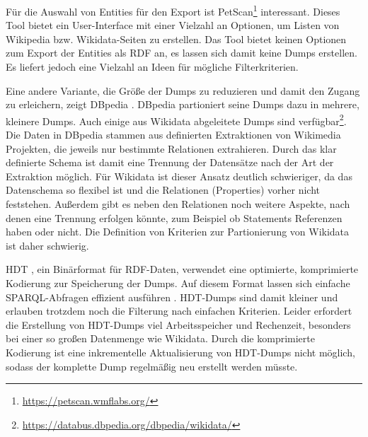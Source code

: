 Für die Auswahl von Entities für den Export ist PetScan\footnote{\url{https://petscan.wmflabs.org/}} interessant.
Dieses Tool bietet ein User-Interface mit einer Vielzahl an Optionen, um Listen von Wikipedia bzw. Wikidata-Seiten zu erstellen. 
Das Tool bietet keinen Optionen zum Export der Entities als RDF an, es lassen sich damit keine Dumps erstellen.
Es liefert jedoch eine Vielzahl an Ideen für mögliche Filterkriterien.

Eine andere Variante, die Größe der Dumps zu reduzieren und damit den Zugang zu erleichern, zeigt DBpedia \cite{dbpedia}.
DBpedia partioniert seine Dumps dazu in mehrere, kleinere Dumps.
Auch einige aus Wikidata abgeleitete Dumps sind verfügbar\footnote{\url{https://databus.dbpedia.org/dbpedia/wikidata/}}.
Die Daten in DBpedia stammen aus definierten Extraktionen von Wikimedia Projekten, die jeweils nur bestimmte Relationen extrahieren.
Durch das klar definierte Schema ist damit eine Trennung der Datensätze nach der Art der Extraktion möglich.
Für Wikidata ist dieser Ansatz deutlich schwieriger, da das Datenschema so flexibel ist und die Relationen (Properties) vorher nicht feststehen.
Außerdem gibt es neben den Relationen noch weitere Aspekte, nach denen eine Trennung erfolgen könnte, zum Beispiel ob Statements Referenzen haben oder nicht.
Die Definition von Kriterien zur Partionierung von Wikidata ist daher schwierig.

HDT \cite{hdt}, ein Binärformat für RDF-Daten, verwendet eine optimierte, komprimierte Kodierung zur Speicherung der Dumps.
Auf diesem Format lassen sich einfache SPARQL-Abfragen effizient ausführen \cite{hdt-query}.
HDT-Dumps sind damit kleiner und erlauben trotzdem noch die Filterung nach einfachen Kriterien.
Leider erfordert die Erstellung von HDT-Dumps viel Arbeitsspeicher und Rechenzeit, besonders bei einer so großen Datenmenge wie Wikidata.
Durch die komprimierte Kodierung ist eine inkrementelle Aktualisierung von HDT-Dumps nicht möglich, sodass der komplette Dump regelmäßig neu erstellt werden müsste.

